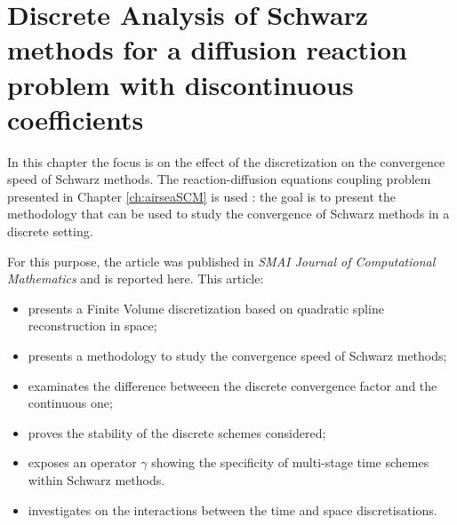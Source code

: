 \chapter{Discrete Analysis of Schwarz methods for a diffusion reaction problem with discontinuous coefficients}
\label{ch:discreteSchwarzAnalysis}
\minitoc
In this chapter the focus is on the effect of the discretization
on the convergence speed of Schwarz methods. The reaction-diffusion
equations coupling problem presented in
Chapter \ref{ch:airseaSCM} is used : the goal is
to present the methodology
that can be used to study the convergence
of Schwarz methods in a discrete setting.
\par
For this purpose, the article
\citep{clement_discrete_2022-1} was published in
\textit{SMAI Journal of Computational Mathematics} and is reported
here.
This article:
\begin{itemize}
	\item presents a Finite Volume discretization based
	on quadratic spline reconstruction in space;
	\item presents a methodology to study the convergence
	speed of Schwarz methods;
	\item examinates the difference betweeen
	the discrete convergence factor and the continuous one;
	\item proves the stability of the discrete schemes considered;
	\item exposes an operator $\gamma$ showing the specificity
	of multi-stage time schemes within Schwarz methods.
	\item investigates on the interactions between the time
		and space discretisations.
\end{itemize}
\setlength{\footskip}{110pt}

%



